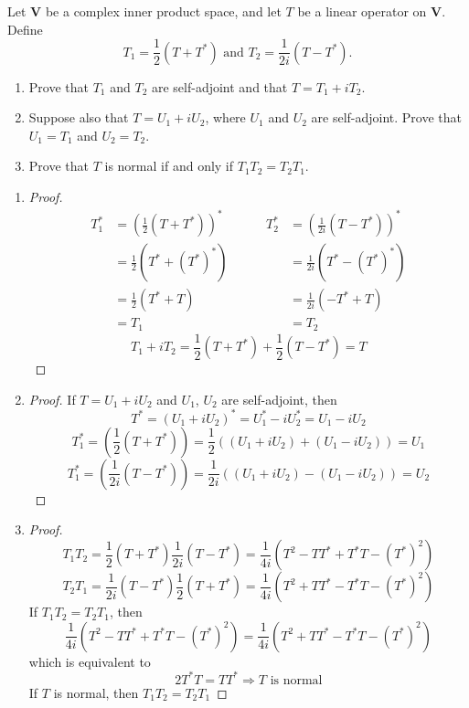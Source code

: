 \begin{homeworkProblem}

Let $\mathbf{V}$ be a complex inner product space, and let $T$ be a linear
operator on $\mathbf{V}$. Define
\[
    T_1 = \frac{1}{2}\left(T + T^*\right) \text{ and }
    T_2 = \frac{1}{2i}\left(T - T^*\right).
\]

\begin{enumerate}
    \item Prove that $T_1$ and $T_2$ are self-adjoint and that $T = T_1 + iT_2$.
    \item Suppose also that $T = U_1 + iU_2$, where $U_1$ and $U_2$ are
    self-adjoint. Prove that $U_1 = T_1$ and $U_2 = T_2$.
    \item Prove that $T$ is normal if and only if $T_1T_2 = T_2T_1$.
\end{enumerate}

\solution
\begin{enumerate}
    \item \begin{proof}
\[
\begin{aligned}
T_1^* &= \left(\frac{1}{2}(T + T^*)\right)^* \\
&= \frac{1}{2}(T^* + (T^*)^*)\\
&= \frac{1}{2}(T^* + T) \\
&= T_1
\end{aligned}
\quad \, \quad
\begin{aligned}
T_2^* &= \left(\frac{1}{2i}(T - T^*)\right)^* \\
&= \frac{1}{2i}(T^* - (T^*)^*) \\
&= \frac{1}{2i}(-T^* + T) \\
&= T_2
\end{aligned}
\]
\[T_1 + iT_2 = \frac{1}{2} (T + T^*) + \frac{1}{2}(T - T^*) = T \]
\end{proof}
\item \begin{proof}
    If $T = U_1 + i U_2$ and $U_1$, $U_2$ are self-adjoint, then
    \[
        T^* = (U_1 + iU_2)^* = U_1^* - iU_2^* = U_1 - iU_2
    \]
    \[
        T_1^* = \left(\frac{1}{2}(T + T^*)\right)
        = \frac{1}{2}((U_1 + iU_2) + (U_1 - iU_2)) = U_1
    \]
    \[
        T_1^* = \left(\frac{1}{2i}(T - T^*)\right)
        = \frac{1}{2i}((U_1 + iU_2) - (U_1 - iU_2)) = U_2
    \]
\end{proof}
\item \begin{proof}
\[
T_1T_2 = \frac{1}{2}(T + T^*)\frac{1}{2i}(T - T^*)
= \frac{1}{4i}(T^2 - TT^* + T^*T - (T^*)^2)
\]
\[
T_2T_1 = \frac{1}{2i}(T - T^*)\frac{1}{2}(T + T^*)
= \frac{1}{4i}(T^2 + TT^* - T^*T - (T^*)^2)
\]
If $T_1T_2 = T_2 T_1$, then \[
    \frac{1}{4i}(T^2 - TT^* + T^*T - (T^*)^2)
    = \frac{1}{4i}(T^2 + TT^* - T^*T - (T^*)^2)
\] which is equivalent to \[
2T^*T = TT^* \Longrightarrow T \text{ is normal}
\]
If $T$ is normal, then $T_1T_2 = T_2T_1$
\end{proof}
\end{enumerate}

\end{homeworkProblem}
